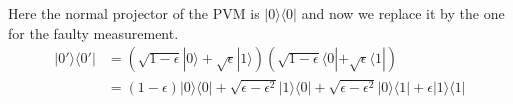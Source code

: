 \documentclass[12pt,a4]{article}
\begin{document}
\begin{enumerate}
\begin{enumerate}
        Here the normal projector of the PVM is $|0 \rangle \langle 0|$ and now we replace it by the one for the faulty measurement.
        \begin{align*}
          | 0' \rangle \langle 0' | &= (\sqrt{1 - \epsilon}|0\rangle + \sqrt{\epsilon} |1\rangle)(\sqrt{1 - \epsilon}\langle 0 |+ \sqrt{\epsilon} \langle 1 |) \\
                                    &= (1 - \epsilon)|0\rangle \langle 0| + \sqrt{\epsilon - \epsilon^2} |1\rangle \langle 0| + \sqrt{\epsilon - \epsilon^2} |0\rangle \langle 1| + \epsilon |1\rangle \langle 1|\\

\end{align*}
\end{enumerate}
\end{enumerate}
\end{document}

